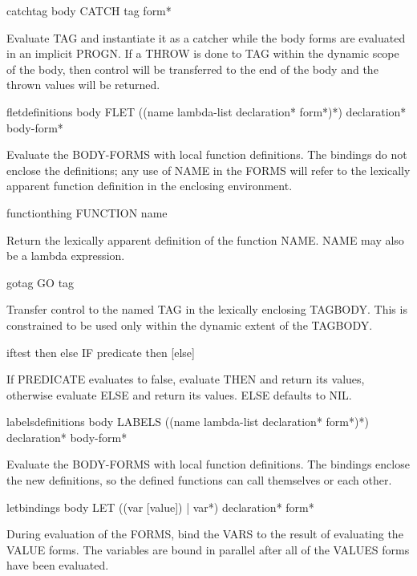 \begin{specialop}{catch}{tag \body body}{}{}
  CATCH tag form*

Evaluate TAG and instantiate it as a catcher while the body forms are
evaluated in an implicit PROGN. If a THROW is done to TAG within the dynamic
scope of the body, then control will be transferred to the end of the body and
the thrown values will be returned.
\end{specialop}

\begin{specialop}{flet}{definitions \body body}{}{}
  FLET ({(name lambda-list declaration* form*)}*) declaration* body-form*

Evaluate the BODY-FORMS with local function definitions. The bindings do
not enclose the definitions; any use of NAME in the FORMS will refer to the
lexically apparent function definition in the enclosing environment.
\end{specialop}

\begin{specialop}{function}{thing}{}{}
  FUNCTION name

Return the lexically apparent definition of the function NAME. NAME may also
be a lambda expression.
\end{specialop}

\begin{specialop}{go}{tag}{}{}
  GO tag

Transfer control to the named TAG in the lexically enclosing TAGBODY. This is
constrained to be used only within the dynamic extent of the TAGBODY.
\end{specialop}

\begin{specialop}{if}{test then \op else}{}{}
  IF predicate then [else]

If PREDICATE evaluates to false, evaluate THEN and return its values,
otherwise evaluate ELSE and return its values. ELSE defaults to NIL.
\end{specialop}

\begin{specialop}{labels}{definitions \body body}{}{}
  LABELS ({(name lambda-list declaration* form*)}*) declaration* body-form*

Evaluate the BODY-FORMS with local function definitions. The bindings enclose
the new definitions, so the defined functions can call themselves or each
other.
\end{specialop}

\begin{specialop}{let}{bindings \body body}{}{}
  LET ({(var [value]) | var}*) declaration* form*

During evaluation of the FORMS, bind the VARS to the result of evaluating the
VALUE forms. The variables are bound in parallel after all of the VALUES forms
have been evaluated.
\end{specialop}

